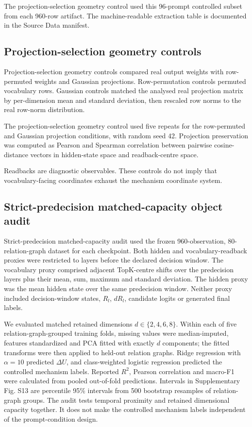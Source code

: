 \documentclass[11pt]{article}
\begin{document}
The projection-selection geometry control used this 96-prompt controlled subset from each 960-row artifact. The machine-readable extraction table is documented in the Source Data manifest.

\subsection*{Projection-selection geometry controls}
Projection-selection geometry controls compared real output weights with row-permuted weights and Gaussian projections. Row-permutation controls permuted vocabulary rows. Gaussian controls matched the analysed real projection matrix by per-dimension mean and standard deviation, then rescaled row norms to the real row-norm distribution.

The projection-selection geometry control used five repeats for the row-permuted and Gaussian projection conditions, with random seed 42. Projection preservation was computed as Pearson and Spearman correlation between pairwise cosine-distance vectors in hidden-state space and readback-centre space.

Readbacks are diagnostic observables. These controls do not imply that vocabulary-facing coordinates exhaust the mechanism coordinate system.

\subsection*{Strict-predecision matched-capacity object audit}
Strict-predecision matched-capacity audit used the frozen 960-observation, 80-relation-graph dataset for each checkpoint. Both hidden and vocabulary-readback proxies were restricted to layers before the declared decision window. The vocabulary proxy comprised adjacent TopK-centre shifts over the predecision layers plus their mean, sum, maximum and standard deviation. The hidden proxy was the mean hidden state over the same predecision window. Neither proxy included decision-window states, \(R_l\), \(dR_l\), candidate logits or generated final labels.

We evaluated matched retained dimensions \(d\in\{2,4,6,8\}\). Within each of five relation-graph-grouped training folds, missing values were median-imputed, features standardized and PCA fitted with exactly \(d\) components; the fitted transforms were then applied to held-out relation graphs. Ridge regression with \(\alpha=10\) predicted \(\Delta U\), and class-weighted logistic regression predicted the controlled mechanism labels. Reported \(R^2\), Pearson correlation and macro-F1 were calculated from pooled out-of-fold predictions. Intervals in Supplementary Fig. S13 are percentile 95\% intervals from 500 bootstrap resamples of relation-graph groups. The audit tests temporal proximity and retained dimensional capacity together. It does not make the controlled mechanism labels independent of the prompt-condition design.
\end{document}
